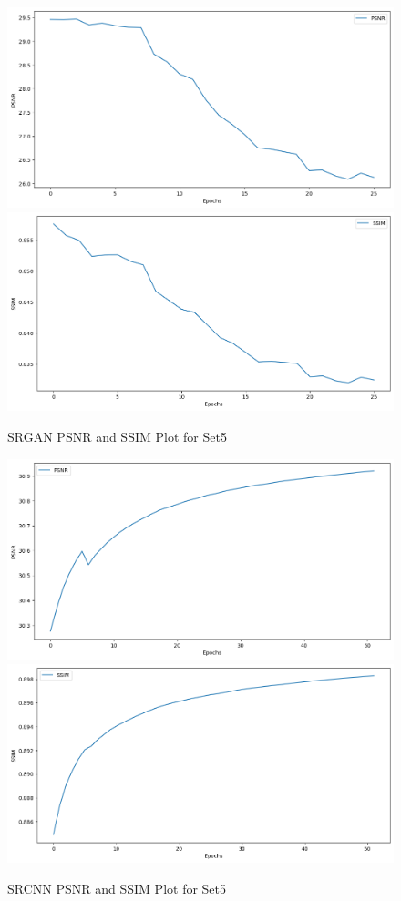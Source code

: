 \begin{figure}[h]
    \centering
    \includegraphics[width=5.5in]{./figures/srgan_psnr.png}
    \includegraphics[width=5.5in]{./figures/srgan_ssim.png}
    \caption{SRGAN PSNR and SSIM Plot for Set5}
\end{figure}  
\begin{figure}[h]
    \centering
    \includegraphics[width=5.5in]{./figures/SRCNN_PSNR.png}
    \includegraphics[width=5.5in]{./figures/SRCNN_SSIM.png}
    \caption{SRCNN PSNR and SSIM Plot for Set5}
\end{figure} 
